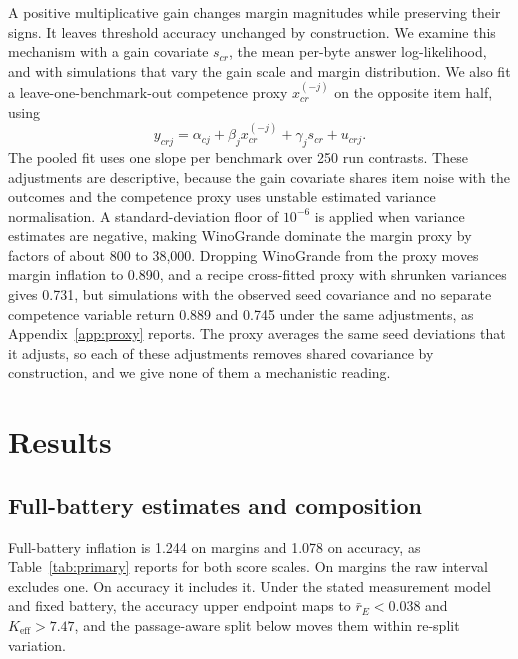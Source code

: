 \documentclass{article}
\begin{document}
A positive multiplicative gain changes margin magnitudes while preserving their signs. It leaves threshold accuracy unchanged by construction. We examine this mechanism with a gain covariate $s_{cr}$, the mean per-byte answer log-likelihood, and with simulations that vary the gain scale and margin distribution. We also fit a leave-one-benchmark-out competence proxy $x_{cr}^{(-j)}$ on the opposite item half, using
\begin{equation}
y_{crj}=\alpha_{cj}+\beta_jx_{cr}^{(-j)}+\gamma_js_{cr}+u_{crj}.
\end{equation}
The pooled fit uses one slope per benchmark over 250 run contrasts. These adjustments are descriptive, because the gain covariate shares item noise with the outcomes and the competence proxy uses unstable estimated variance normalisation. A standard-deviation floor of $10^{-6}$ is applied when variance estimates are negative, making WinoGrande dominate the margin proxy by factors of about 800 to 38,000. Dropping WinoGrande from the proxy moves margin inflation to 0.890, and a recipe cross-fitted proxy with shrunken variances gives 0.731, but simulations with the observed seed covariance and no separate competence variable return 0.889 and 0.745 under the same adjustments, as Appendix~\ref{app:proxy} reports. The proxy averages the same seed deviations that it adjusts, so each of these adjustments removes shared covariance by construction, and we give none of them a mechanistic reading.

\section{Results}
\subsection{Full-battery estimates and composition}
\label{sec:composition}
Full-battery inflation is 1.244 on margins and 1.078 on accuracy, as Table~\ref{tab:primary} reports for both score scales. On margins the raw interval excludes one. On accuracy it includes it. Under the stated measurement model and fixed battery, the accuracy upper endpoint maps to $\bar r_E<0.038$ and $K_{\mathrm{eff}}>7.47$, and the passage-aware split below moves them within re-split variation.
\end{document}
